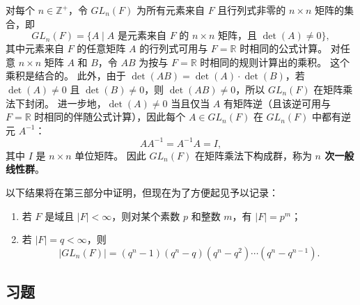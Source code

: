对每个 \( n \in \mathbb{Z}^+ \)，令 \( GL_n(F) \) 为所有元素来自 \( F \) 且行列式非零的 \( n \times n \) 矩阵的集合，即
\[
GL_n(F) = \{A \mid A \text{ 是元素来自 } F \text{ 的 } n \times n \text{ 矩阵，且 } \det(A) \neq 0\},
\]
其中元素来自 \( F \) 的任意矩阵 \( A \) 的行列式可用与 \( F = \mathbb{R} \) 时相同的公式计算。
对任意 \( n \times n \) 矩阵 \( A \) 和 \( B \)，令 \( AB \) 为按与 \( F = \mathbb{R} \) 时相同的规则计算出的乘积。
这个乘积是结合的。
此外，由于 \( \det(AB) = \det(A) \cdot \det(B) \)，若 \( \det(A) \neq 0 \) 且 \( \det(B) \neq 0 \)，则 \( \det(AB) \neq 0 \)，所以 \( GL_n(F) \) 在矩阵乘法下封闭。
进一步地，\( \det(A) \neq 0 \) 当且仅当 \( A \) 有矩阵逆（且该逆可用与 \( F = \mathbb{R} \) 时相同的伴随公式计算），因此每个 \( A \in GL_n(F) \) 在 \( GL_n(F) \) 中都有逆元 \( A^{-1} \)：
\[
AA^{-1} = A^{-1}A = I,
\]
其中 \( I \) 是 \( n \times n \) 单位矩阵。
因此 \( GL_n(F) \) 在矩阵乘法下构成群，称为 \textbf{\( n \) 次一般线性群}。

以下结果将在第三部分中证明，但现在为了方便起见予以记录：
\begin{enumerate}[label=\arabic*]
\item 若 \( F \) 是域且 \( |F| < \infty \)，则对某个素数 \( p \) 和整数 \( m \)，有 \( |F| = p^m \)；
\item 若 \( |F| = q < \infty \)，则
\[
|GL_n(F)| = (q^n - 1)(q^n - q)(q^n - q^2)\cdots(q^n - q^{n-1}).
\]
\end{enumerate}

\subsection*{习题}


